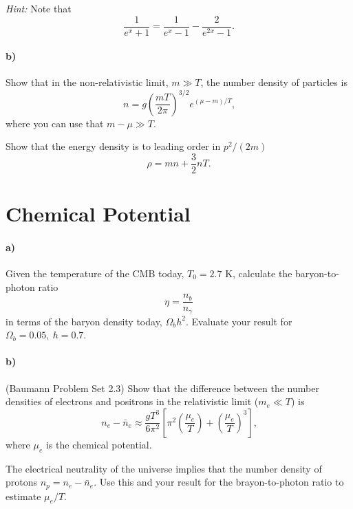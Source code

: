 \documentclass[12pt]{article}
\begin{document}
\emph{Hint:} Note that
\begin{equation}
    \frac{1}{e^x + 1} = \frac{1}{e^x - 1} - \frac{2}{e^{2x} - 1} \text{.}
\end{equation}

\paragraph{b)} Show that in the non-relativistic limit, $m \gg T$, the number
density of particles is
\begin{equation}
    n = g \left(\frac{m T}{2 \pi}\right)^{3/2} e^{(\mu-m)/T} \text{,}
\label{eq:nr-density}
\end{equation}
where you can use that $m - \mu \gg T$.

Show that the energy density is to leading order in $p^2 / (2m)$
\begin{equation}
    \rho = m n + \frac{3}{2} n T \text{.}
\end{equation}


\section{Chemical Potential}

\paragraph{a)} Given the temperature of the CMB today, $T_0 = 2.7$ K, calculate
the baryon-to-photon ratio
\begin{equation}
    \eta = \frac{n_b}{n_\gamma}
\end{equation}
in terms of the baryon density today, $\Omega_b h^2$. Evaluate your result for
$\Omega_b=0.05,\ h=0.7$.

\paragraph{b)} (Baumann Problem Set 2.3)
Show that the difference between the number densities of electrons and positrons
in the relativistic limit ($m_e \ll T$) is
\begin{equation}
    n_e - \bar{n}_e \approx \frac{gT^3}{6 \pi^2}\left[\pi^2
    \left(\frac{\mu_e}{T}\right) + \left(\frac{\mu_e}{T}\right)^3
    \right] \text{,}
\end{equation}
where $\mu_e$ is the chemical potential.

The electrical neutrality of the universe implies that the number density of
protons $n_p = n_e - \bar{n}_e$. Use this and your result for the
brayon-to-photon ratio to estimate $\mu_e/T$.
\end{document}
